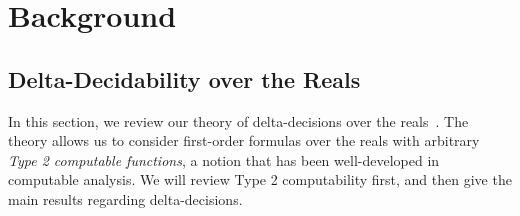 \documentclass[10pt]{article}
\theoremstyle{definition}
\begin{document}
\section{Background}\label{back}

\subsection{Delta-Decidability over the Reals}\label{delta-decide}

In this section, we review our theory of delta-decisions over the reals~\cite{DBLP:conf/lics/GaoAC12}. The theory allows us to consider first-order formulas over the reals with arbitrary {\em Type 2 computable functions}, a notion that has been well-developed in computable analysis. We will review Type 2 computability first, and then give the main results regarding delta-decisions. 
\end{document}

